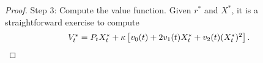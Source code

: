 \documentclass[openany,oneside]{article}
\theoremstyle{definition}
\theoremstyle{remark}
\newcommand{\E}{\mathbb{E}} %
\newcommand{\ts}{\textstyle}
\begin{document}
\begin{proof}
Step 3: Compute the value function. Given $r^*$ and $X^*$, it is a straightforward exercise to compute
\[
 \ts V^\ast_t = P_t X_t^\ast + \kappa\left[v_0(t) + 2 v_1(t) X_t^\ast + v_2(t) (X_t^\ast)^2\right].\qedhere
\]
\end{proof}
\end{document}
